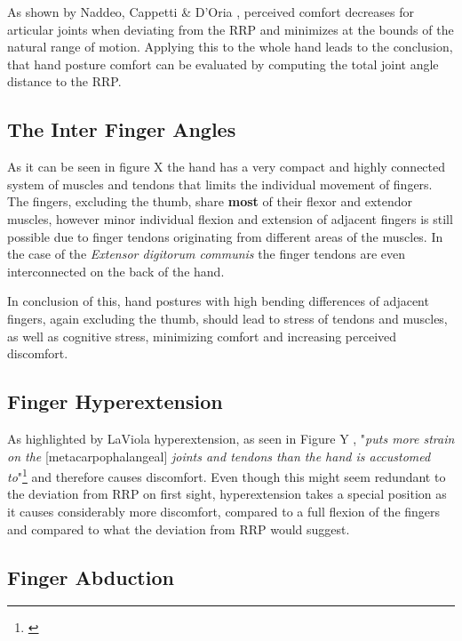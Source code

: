 \documentclass{sig-alternate-05-2015}
\begin{document}
As shown by Naddeo, Cappetti \& D'Oria 
\cite{naddeo2015proposal}, perceived comfort decreases for articular joints when deviating from the RRP and minimizes at the bounds of the natural range of motion. Applying this to the whole hand leads to the conclusion, that hand posture comfort can be evaluated by computing the total joint angle distance to the RRP.

\subsection{The Inter Finger Angles}

As it can be seen in figure X
the hand has a very compact and highly connected system of muscles and tendons that limits the individual movement of fingers.
The fingers, excluding the thumb, share \textbf{most} of their flexor and extendor muscles, however minor individual flexion and extension of adjacent fingers is still possible due to finger tendons originating from different areas of the muscles. In the case of the \textit{Extensor digitorum communis} the finger tendons are even interconnected on the back of the hand. 

In conclusion of this, hand postures with high bending differences of adjacent fingers, again excluding the thumb, should lead to stress of tendons and muscles, as well as cognitive stress, minimizing comfort and increasing perceived discomfort.

\subsection{Finger Hyperextension}

As highlighted by LaViola \cite{laviola1999survey} hyperextension, as seen in Figure Y
, "\textit{puts more strain on the }[metacarpophalangeal] \textit{joints and tendons than the hand is accustomed to}"\footnote{\cite{laviola1999survey}} and therefore causes discomfort. Even though this might seem redundant to the deviation from RRP on first sight, hyperextension takes a special position as it causes considerably more discomfort, compared to a full flexion of the fingers and compared to what the deviation from RRP would suggest.

\subsection{Finger Abduction}
\end{document}
